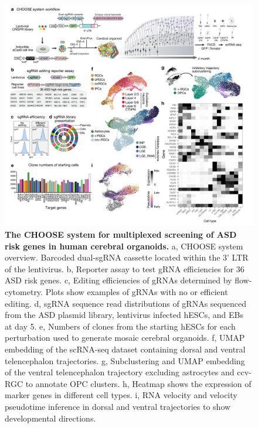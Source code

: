 \begin{figure}[t!]
    \centering
	\includegraphics[width=\textwidth]{figures/asd/Figure_1}
    \caption{\textbf{The CHOOSE system for multiplexed screening of ASD risk genes in human cerebral organoids.}
    a, CHOOSE system overview. Barcoded dual-sgRNA cassette located within the 3' LTR of the lentivirus. b, Reporter assay to test gRNA efficiencies for 36 ASD risk genes. c, Editing efficiencies of gRNAs determined by flow-cytometry. Plots show examples of gRNAs with no or efficient editing. d, sgRNA sequence read distributions of gRNAs sequenced from the ASD plasmid library, lentivirus infected hESCs, and EBs at day 5. e, Numbers of clones from the starting hESCs for each perturbation used to generate mosaic cerebral organoids. f, UMAP embedding of the scRNA-seq dataset containing dorsal and ventral telencephalon trajectories. g, Subclustering and UMAP embedding of the ventral telencephalon trajectory excluding astrocytes and ccv-RGC to annotate OPC clusters. h, Heatmap shows the expression of marker genes in different cell types. i, RNA velocity and velocity pseudotime inference in dorsal and ventral trajectories to show developmental directions.}
    \label{fig:asd1}
\end{figure}

